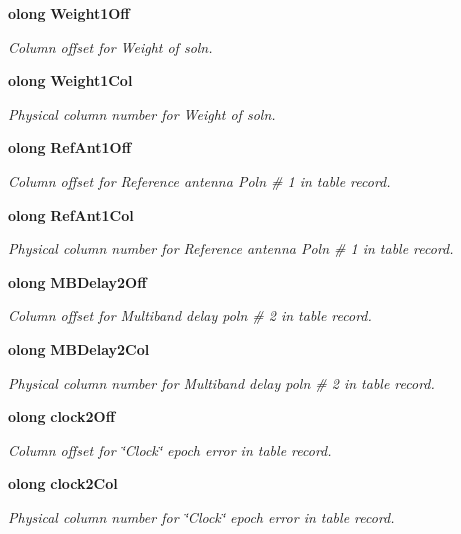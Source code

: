 \begin{CompactItemize}
{\bf olong} {\bf Weight1Off}
\begin{CompactList}\small\item\em Column offset for Weight of soln. \item\end{CompactList}\item 
{\bf olong} {\bf Weight1Col}
\begin{CompactList}\small\item\em Physical column number for Weight of soln. \item\end{CompactList}\item 
{\bf olong} {\bf Ref\-Ant1Off}
\begin{CompactList}\small\item\em Column offset for Reference antenna Poln \# 1 in table record. \item\end{CompactList}\item 
{\bf olong} {\bf Ref\-Ant1Col}
\begin{CompactList}\small\item\em Physical column number for Reference antenna Poln \# 1 in table record. \item\end{CompactList}\item 
{\bf olong} {\bf MBDelay2Off}
\begin{CompactList}\small\item\em Column offset for Multiband delay poln \# 2 in table record. \item\end{CompactList}\item 
{\bf olong} {\bf MBDelay2Col}
\begin{CompactList}\small\item\em Physical column number for Multiband delay poln \# 2 in table record. \item\end{CompactList}\item 
{\bf olong} {\bf clock2Off}
\begin{CompactList}\small\item\em Column offset for \char`\"{}Clock\char`\"{} epoch error in table record. \item\end{CompactList}\item 
{\bf olong} {\bf clock2Col}
\begin{CompactList}\small\item\em Physical column number for \char`\"{}Clock\char`\"{} epoch error in table record. \item\end{CompactList}\item 

\end{CompactItemize}
